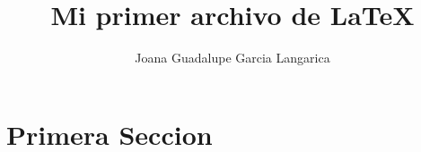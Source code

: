 \documentclass{article}
\title{Mi primer archivo de \LaTeX}
\author{Joana Guadalupe Garcia Langarica}
\begin{document}
	
	\maketitle
	
	\section{Primera Seccion}
	
\end{document}
